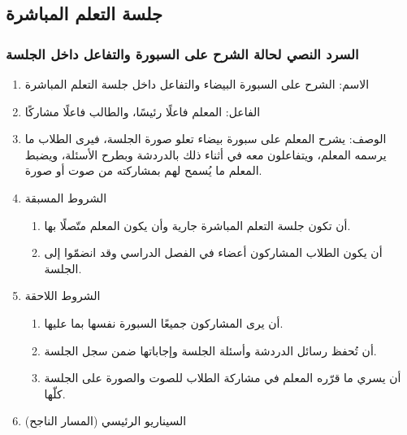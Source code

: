 \subsection{جلسة التعلم المباشرة}

\subsubsection{السرد النصي لحالة الشرح على السبورة والتفاعل داخل الجلسة}
\label{subsubsec:uc-whiteboard}

\begin{enumerate}
  \item الاسم: الشرح على السبورة البيضاء والتفاعل داخل جلسة التعلم المباشرة
  \item الفاعل: المعلم فاعلًا رئيسًا، والطالب فاعلًا مشاركًا
  \item الوصف: يشرح المعلم على سبورة بيضاء تعلو صورة الجلسة، فيرى الطلاب ما يرسمه المعلم، ويتفاعلون معه في أثناء ذلك بالدردشة وبطرح الأسئلة، ويضبط المعلم ما يُسمح لهم بمشاركته من صوت أو صورة.
  \item الشروط المسبقة
  \begin{enumerate}
    \item أن تكون جلسة التعلم المباشرة جارية وأن يكون المعلم متّصلًا بها.
    \item أن يكون الطلاب المشاركون أعضاء في الفصل الدراسي وقد انضمّوا إلى الجلسة.
  \end{enumerate}
  \item الشروط اللاحقة
  \begin{enumerate}
    \item أن يرى المشاركون جميعًا السبورة نفسها بما عليها.
    \item أن تُحفظ رسائل الدردشة وأسئلة الجلسة وإجاباتها ضمن سجل الجلسة.
    \item أن يسري ما قرّره المعلم في مشاركة الطلاب للصوت والصورة على الجلسة كلّها.
  \end{enumerate}
  \item السيناريو الرئيسي (المسار الناجح)
\end{enumerate}

